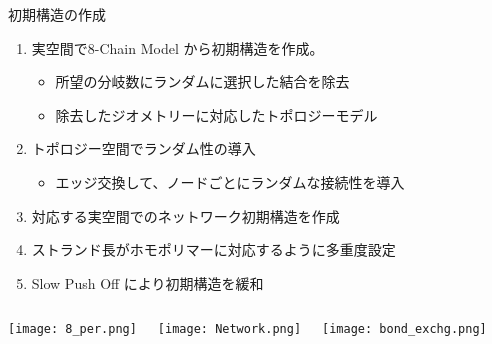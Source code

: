 \begin{columns}[totalwidth=.85\linewidth]
    \column{\textwidth}
    \vspace{-10mm}
        \begin{itembox}[l]{初期構造の作成\cite{sasaki}}
            \begin{enumerate}
                \item \alert{実空間}で8-Chain Model から初期構造を作成。
                    \begin{itemize}
                        \normalsize
                        \item 所望の分岐数に\alert{ランダム}に選択した\alert{結合を除去}
                        \item 除去したジオメトリーに対応した\alert{トポロジーモデル}
                    \end{itemize}
                \item トポロジー空間でランダム性の導入
                    \begin{itemize}
                        \normalsize
                        \item \alert{エッジ交換}して、ノードごとにランダムな接続性を導入
                    \end{itemize}	
                \item 対応する\alert{実空間でのネットワーク初期構造}を作成
                \item \alert{ストランド長がホモポリマーに対応}するように多重度設定
                \item \alert{Slow Push Off\cite{auhl} により初期構造を緩和}
            \end{enumerate}

            \vspace{-1mm}
            \begin{columns}[T, onlytextwidth]
                    \texttt{[image: 8\_per.png]}
                    \vspace{-5mm}
                    \begin{center}
                        \texttt{[image: Network.png]}
                    \end{center}
                    \texttt{[image: bond\_exchg.png]}
            \end{columns}
        \end{itembox}


\end{columns}
